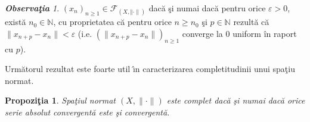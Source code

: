 \documentclass[ a4paper, 12pt]{report}
\newtheorem{prop}[theorem]{\bf Propozi\c tia }
\theoremstyle{definition}
\theoremstyle{remark}
\newtheorem{obs}{\bf Observa\c tia }[section]
\numberwithin{equation}{section}
\begin{document}
\begin{obs}
$(x_n)_{n \geq 1} \in \mathcal{F}_{(X, \Vert \cdot \rVert)}$ dac\u a \c si numai dac\u a pentru orice $\varepsilon>0$, exist\u a $n_0 \in \mathbb{N}$, cu proprietatea c\u a pentru orice $n \geq n_0$ \c si $p \in \mathbb{N}$ rezult\u a c\u a $\lVert x_{n+p} - x_n \rVert < \varepsilon$ (i.e. $(\lVert x_{n+p} - x_n \rVert)_{n \geq 1}$ converge la $0$ uniform \^in raport cu $p$).
\end{obs}

Urm\u atorul rezultat este foarte util \^\i n caracterizarea completitudinii unui spa\c tiu normat.

\begin{prop}
Spa\c tiul normat $(X,\lVert \cdot \rVert)$ este complet dac\u a \c si numai dac\u a orice serie absolut convergent\u a este \c si convergent\u a.
\end{prop}
\end{document}
